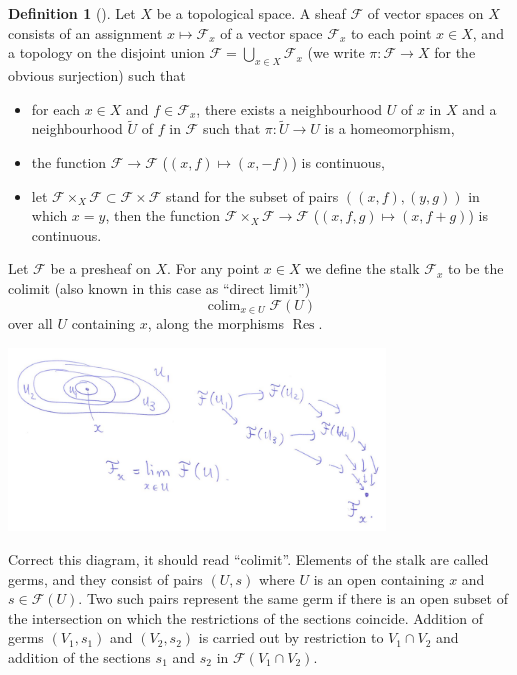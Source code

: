\documentclass[12pt]{article}
\theoremstyle{plain}
\theoremstyle{definition}
\newtheorem{defn}{Definition}[section]
\numberwithin{equation}{section}
\DeclareMathOperator*{\colim}{colim}
\DeclareMathOperator{\res}{Res}
\newcommand{\wtil}[1]{\widetilde{#1}}
\newcommand{\CF}{\mathcal{F}}
\begin{document}
\begin{defn}[{\cite[Section 1]{FAC}}]
Let $X$ be a topological space. A sheaf $\CF$ of vector spaces on $X$ consists of an assignment $x \mapsto \CF_x$ of a vector space $\CF_x$ to each point $x \in X$, and a topology on the disjoint union $\CF = \bigcup_{x \in X} \CF_x$ (we write $\pi : \CF \rightarrow X$ for the obvious surjection) such that
\begin{itemize}
\item for each $x \in X$ and $f \in \CF_x$, there exists a neighbourhood $U$ of $x$ in $X$ and a neighbourhood $\wtil U$ of $f$ in $\CF$ such that $\pi : \wtil U \rightarrow U$ is a homeomorphism,

\item the function $\CF \rightarrow \CF$ ($(x, f) \mapsto (x, -f)$) is continuous,

\item let $\CF \times_X \CF  \subset \CF \times \CF$ stand for the subset of pairs $((x, f), (y, g))$ in which $x = y$, then the function $\CF \times_X \CF \rightarrow \CF$ ($(x, f, g) \mapsto (x, f+g)$) is continuous.
\end{itemize}
\end{defn}
Let $\CF$ be a presheaf on $X$. For any point $x \in X$ we define the stalk $\CF_x$ to be the colimit (also known in this case as ``direct limit'')
\[
\colim_{x \in U} \CF(U)
\]
over all $U$ containing $x$, along the morphisms $\res$.
\begin{center}
\includegraphics[width=100mm]{direct-limit.png}
\end{center}
{\color{red}Correct this diagram, it should read ``colimit''}. Elements of the stalk are called germs, and they consist of pairs $(U, s)$ where $U$ is an open containing $x$ and $s \in \CF(U)$. Two such pairs represent the same germ if there is an open subset of the intersection on which the restrictions of the sections coincide. Addition of germs $(V_1, s_1)$ and $(V_2, s_2)$ is carried out by restriction to $V_1 \cap V_2$ and addition of the sections $s_1$ and $s_2$ in $\CF(V_1 \cap V_2)$.
\end{document}
